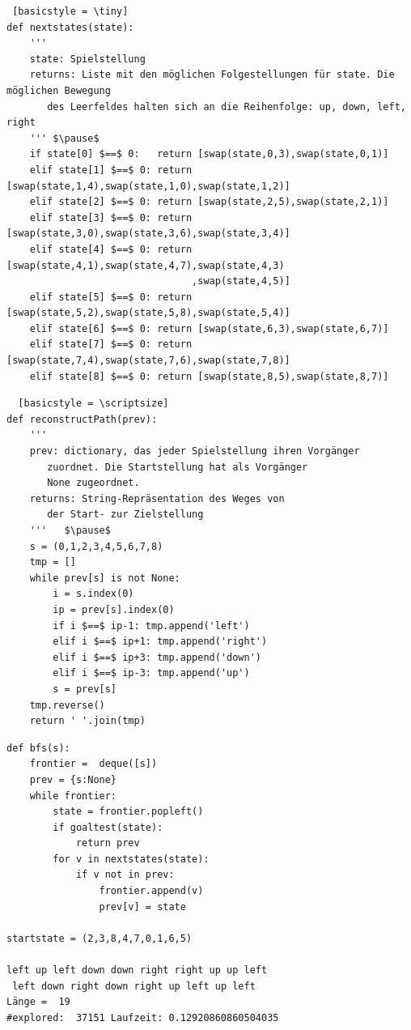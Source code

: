\begin{frame}[fragile]
\begin{lstlisting} [basicstyle = \tiny]
def nextstates(state):
    '''
    state: Spielstellung
    returns: Liste mit den möglichen Folgestellungen für state. Die möglichen Bewegung
       des Leerfeldes halten sich an die Reihenfolge: up, down, left, right 
    ''' $\pause$
    if state[0] $==$ 0:   return [swap(state,0,3),swap(state,0,1)]
    elif state[1] $==$ 0: return [swap(state,1,4),swap(state,1,0),swap(state,1,2)]
    elif state[2] $==$ 0: return [swap(state,2,5),swap(state,2,1)]
    elif state[3] $==$ 0: return [swap(state,3,0),swap(state,3,6),swap(state,3,4)]
    elif state[4] $==$ 0: return [swap(state,4,1),swap(state,4,7),swap(state,4,3)
                                ,swap(state,4,5)]
    elif state[5] $==$ 0: return [swap(state,5,2),swap(state,5,8),swap(state,5,4)]
    elif state[6] $==$ 0: return [swap(state,6,3),swap(state,6,7)]
    elif state[7] $==$ 0: return [swap(state,7,4),swap(state,7,6),swap(state,7,8)]
    elif state[8] $==$ 0: return [swap(state,8,5),swap(state,8,7)]
\end{lstlisting} 
\end{frame}

\begin{frame}[fragile]
\begin{lstlisting}  [basicstyle = \scriptsize]
def reconstructPath(prev):
    '''
    prev: dictionary, das jeder Spielstellung ihren Vorgänger 
       zuordnet. Die Startstellung hat als Vorgänger 
       None zugeordnet.
    returns: String-Repräsentation des Weges von 
       der Start- zur Zielstellung
    '''   $\pause$
    s = (0,1,2,3,4,5,6,7,8)
    tmp = []
    while prev[s] is not None:
        i = s.index(0)
        ip = prev[s].index(0)
        if i $==$ ip-1: tmp.append('left')
        elif i $==$ ip+1: tmp.append('right')
        elif i $==$ ip+3: tmp.append('down')
        elif i $==$ ip-3: tmp.append('up')
        s = prev[s]
    tmp.reverse()
    return ' '.join(tmp)

\end{lstlisting} \pause
\small
\end{frame}

\begin{frame}[fragile]
\begin{lstlisting} 
def bfs(s):
    frontier =  deque([s])
    prev = {s:None}
    while frontier:
        state = frontier.popleft()  
        if goaltest(state):
            return prev
        for v in nextstates(state):
            if v not in prev:
                frontier.append(v)
                prev[v] = state

startstate = (2,3,8,4,7,0,1,6,5)

left up left down down right right up up left
 left down right down right up left up left
Länge =  19
#explored:  37151 Laufzeit: 0.12920860860504035
\end{lstlisting} 


\end{frame}


